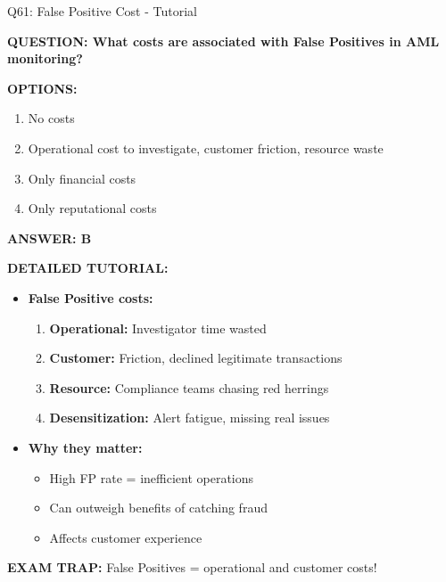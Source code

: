 \documentclass[8pt]{beamer}
\begin{document}
\begin{frame}{Q61: False Positive Cost - Tutorial}
	\fontsize{6.5}{7.5}\selectfont
	
	\textbf{QUESTION: What costs are associated with False Positives in AML monitoring?}
	
	\vspace{0.1cm}
	\textbf{OPTIONS:}
	\begin{enumerate}
		\item No costs
		\item Operational cost to investigate, customer friction, resource waste
		\item Only financial costs
		\item Only reputational costs
	\end{enumerate}
	
	\vspace{0.1cm}
	\textcolor{myblue}{\textbf{ANSWER: B}}
	
	\vspace{0.1cm}
	\textbf{DETAILED TUTORIAL:}
	\begin{itemize}
		\item \textbf{False Positive costs:}
		\begin{enumerate}
			\item \textbf{Operational:} Investigator time wasted
			\item \textbf{Customer:} Friction, declined legitimate transactions
			\item \textbf{Resource:} Compliance teams chasing red herrings
			\item \textbf{Desensitization:} Alert fatigue, missing real issues
		\end{enumerate}
		
		\item \textbf{Why they matter:}
		\begin{itemize}
			\item High FP rate = inefficient operations
			\item Can outweigh benefits of catching fraud
			\item Affects customer experience
		\end{itemize}
	\end{itemize}
	
	\textcolor{myred}{\textbf{EXAM TRAP:}} False Positives = 
	\textcolor{myblue}{operational and customer costs}!
	
\end{frame}
\end{document}
